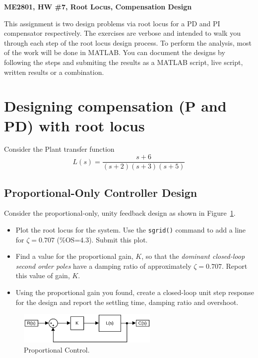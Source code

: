 \documentclass[11pt]{article}
\begin{document}
\begin{center}
  \huge{\bf ME2801, HW \#7, Root Locus, Compensation Design}
\end{center}

This assignment is two design problems via root locus for a PD and PI compensator respectively.  The exercises are verbose and intended to walk you through each step of the root locus design process.  To perform the analysis, most of the work will be done in MATLAB.  You can document the designs by following the steps and submiting the results as a MATLAB script, live script, written results or a combination.


\section{Designing compensation (P and PD) with root locus}

Consider the Plant transfer function
\[
L(s) = \frac{s+6}{(s+2)(s+3)(s+5)}
\]

\subsection{Proportional-Only Controller Design}
Consider the proportional-only, unity feedback design as shown in Figure~\ref{f:p}.
\begin{itemize}
\item Plot the root locus for the system.  Use the \texttt{sgrid()} command to add a line for $\zeta=0.707$ (\%OS=4.3).  Submit this plot.
\item Find a value for the proportional gain, $K$, so that the \emph{dominant closed-loop second order poles} have a damping ratio of approximately $\zeta = 0.707$.  Report this value of gain, $K$.
\item Using the proportional gain you found, create a closed-loop unit step response for the design and report the settling time, damping ratio and overshoot.
\end{itemize}
\begin{figure}[hbt!]
\centering  
\includegraphics [width=0.6\textwidth]{p_control.png}
\caption{Proportional Control.}
\label{f:p}
\end{figure}
\end{document}
